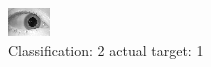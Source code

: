 \begin{figure}[h!]
\begin{center}
\includegraphics[width=0.60\columnwidth]{figures/ID1521_class_2_target_1.png}
\end{center}
\caption{ Classification: 2 actual target: 1}
\label{fig:ID1521_class_2_target_1}
\end{figure}
